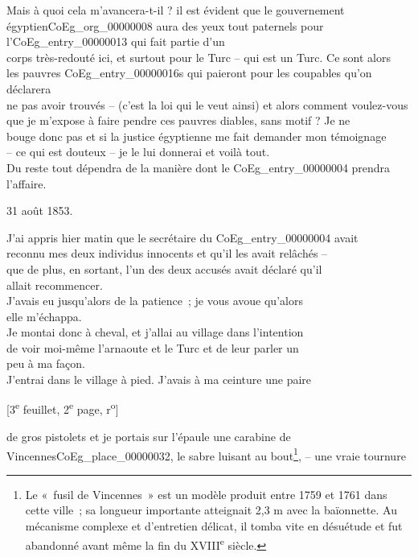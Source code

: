 \documentclass{book}
\begin{document}
Mais à quoi cela m’avancera-t-il ? il est évident que le gouvernement\\
égyptien\gls{CoEg_org_00000008} aura des yeux tout paternels pour l’\gls{CoEg_entry_00000013} qui fait partie d’un\\
corps très-redouté ici, et surtout pour le Turc – qui est un Turc. Ce sont alors\\
les pauvres \Glspl{CoEg_entry_00000016} qui paieront pour les coupables qu’on déclarera\\
ne pas avoir trouvés – (c’est la loi qui le veut ainsi) et alors comment voulez-vous\\
que je m’expose à faire pendre ces pauvres diables, sans motif ? Je ne\\
bouge donc pas et si la justice égyptienne me fait demander mon témoignage\\
– ce qui est douteux – je le lui donnerai et voilà tout.\\
\indent Du reste tout dépendra de la manière dont le \Gls{CoEg_entry_00000004} prendra l’affaire.
\begin{flushright}31 août 1853.\end{flushright}
\indent J’ai appris hier matin que le secrétaire du \Gls{CoEg_entry_00000004} avait\\
reconnu mes deux individus innocents et qu’il les avait relâchés –\\
que de plus, en sortant, l’un des deux accusés avait déclaré qu’il\\
allait recommencer.\\
\indent J’avais eu jusqu’alors de la patience~; je vous avoue qu’alors\\
elle m’échappa.\\
\indent Je montai donc à cheval, et j’allai au village dans l’intention\\
de voir moi-même l’arnaoute et le Turc et de leur parler un\\
peu à ma façon.\\
\indent J’entrai dans le village à pied. J’avais à ma ceinture une paire
{\footnotesize\begin{center} {[3\textsuperscript{e} feuillet, 2\textsuperscript{e} page, r\textsuperscript{o}]}\end{center}}
\noindent de gros pistolets et je portais sur l’épaule une carabine de\\
Vincennes\gls{CoEg_place_00000032}, le sabre luisant au bout\footnote{Le «~fusil de Vincennes~» est un modèle produit entre 1759 et 1761 dans cette ville~; sa longueur importante atteignait 2,3 m avec la baïonnette. Au mécanisme complexe et d'entretien délicat, il tomba vite en désuétude et fut abandonné avant même la fin du XVIII\textsuperscript{e} siècle.}, – une vraie tournure\\
\end{document}
